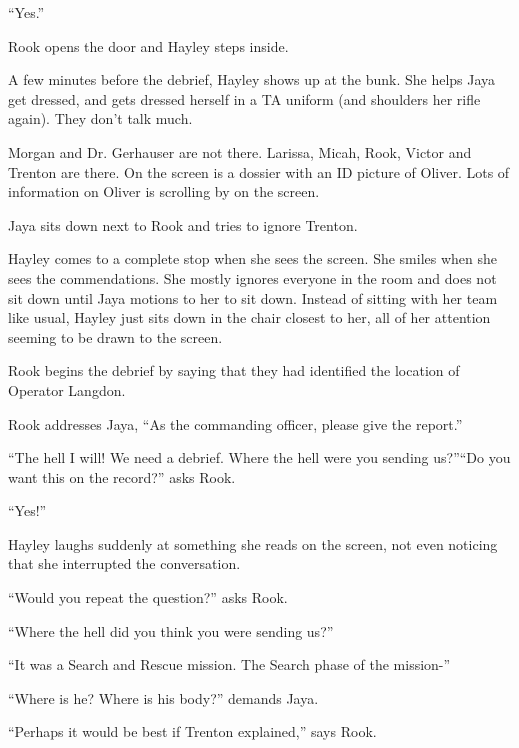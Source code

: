 ``Yes.''

Rook opens the door and Hayley steps inside.





A few minutes before the debrief, Hayley shows up at the bunk.  She helps Jaya get dressed, and gets dressed herself in a TA uniform (and shoulders her rifle again).  They don't talk much.





Morgan and Dr. Gerhauser are not there.  Larissa, Micah, Rook, Victor and Trenton are there.  On the screen is a dossier with an ID picture of Oliver.  Lots of information on Oliver is scrolling by on the screen.



Jaya sits down next to Rook and tries to ignore Trenton.



Hayley comes to a complete stop when she sees the screen.  She smiles when she sees the commendations.  She mostly ignores everyone in the room and does not sit down until Jaya motions to her to sit down.  Instead of sitting with her team like usual, Hayley just sits down in the chair closest to her, all of her attention seeming to be drawn to the screen.



Rook begins the debrief by saying that they had identified the location of Operator Langdon.  

Rook addresses Jaya, ``As the commanding officer, please give the report.'' 

``The hell I will!  We need a debrief.  Where the hell were you sending us?''``Do you want this on the record?'' asks Rook.

``Yes!''

Hayley laughs suddenly at something she reads on the screen, not even noticing that she interrupted the conversation.

``Would you repeat the question?'' asks Rook.

``Where the hell did you think you were sending us?''

``It was a Search and Rescue mission.  The Search phase of the mission-''

``Where is he?  Where is his body?'' demands Jaya.

``Perhaps it would be best if Trenton explained,'' says Rook.

